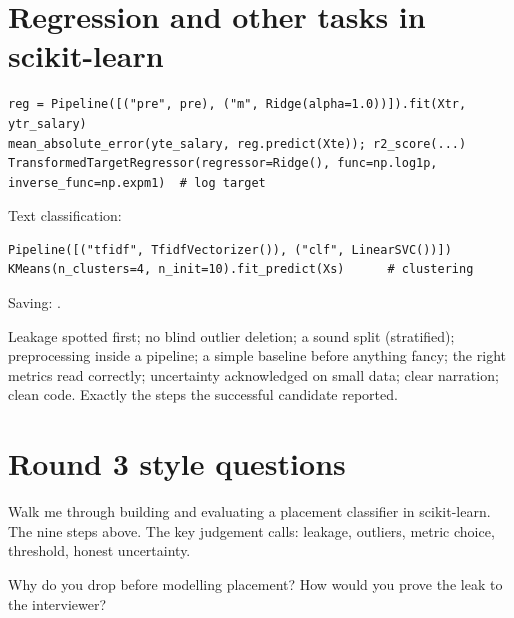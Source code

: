 \section{Regression and other tasks in scikit-learn}
\begin{lstlisting}
reg = Pipeline([("pre", pre), ("m", Ridge(alpha=1.0))]).fit(Xtr, ytr_salary)
mean_absolute_error(yte_salary, reg.predict(Xte)); r2_score(...)
TransformedTargetRegressor(regressor=Ridge(), func=np.log1p, inverse_func=np.expm1)  # log target
\end{lstlisting}
Text classification:
\begin{lstlisting}
Pipeline([("tfidf", TfidfVectorizer()), ("clf", LinearSVC())])
KMeans(n_clusters=4, n_init=10).fit_predict(Xs)      # clustering
\end{lstlisting}
Saving: .

\begin{practical}
Leakage spotted first; no blind outlier deletion; a sound split (stratified); preprocessing inside a pipeline; a simple baseline before anything fancy; the right metrics read
correctly; uncertainty acknowledged on small data; clear narration; clean code. Exactly the steps the successful candidate reported.
\end{practical}

\section{Round 3 style questions}

\begin{qa}{ Walk me through building and evaluating a placement classifier in scikit-learn.}
\why The nine steps above. The key judgement calls: leakage, outliers, metric choice, threshold, honest uncertainty.
\end{qa}

\begin{qa}{ Why do you drop  before modelling placement? How would you prove the leak to the interviewer?}
\end{qa}

